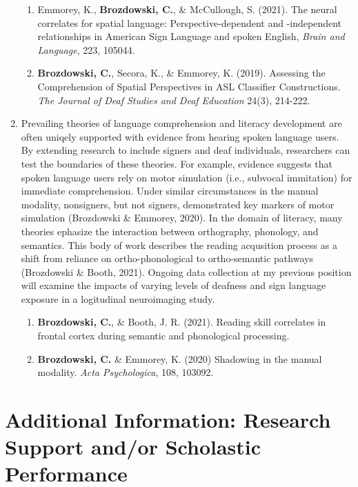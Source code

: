 \documentclass{nihbiosketch}
\begin{document}
\begin{enumerate}
\begin{enumerate}

\item Emmorey, K., \textbf{Brozdowski, C.}, \& McCullough, S. (2021). The neural
        correlates for spatial language: Perspective-dependent and -independent
        relationships in American Sign Language and spoken English,
        \textit{Brain and Language}, 223, 105044.

\item \textbf{Brozdowski, C.}, Secora, K., \& Emmorey, K. (2019). Assessing the
        Comprehension of Spatial Perspectives in ASL Classifier Constructions.
        \textit{The Journal of Deaf Studies and Deaf Education} 24(3), 214-222.

\end{enumerate}
\item Prevailing theories of language comprehension and literacy development are often
 uniqely supported with evidence from hearing spoken language users. By extending
 research to include signers and deaf individuals, researchers can test the boundaries
 of these theories. For example, evidence suggests that spoken language users rely on
 motor simulation (i.e., subvocal immitation) for immediate comprehension. Under
 similar circumstances in the manual modality, nonsigners, but not signers,
 demonstrated key markers of motor simulation (Brozdowski \& Emmorey, 2020). In the
 domain of literacy, many theories ephasize the interaction between orthography,
 phonology, and semantics. This body of work describes the reading acqusition process
 as a shift from reliance on ortho-phonological to ortho-semantic pathways
 (Brozdowski \& Booth, 2021). Ongoing data collection at my previous position will
 examine the impacts of varying levels of deafness and sign language exposure in a
 logitudinal neuroimaging study.

\begin{enumerate}   

\item \textbf{Brozdowski, C.}, \& Booth, J. R. (2021). Reading skill correlates in
        frontal cortex during semantic and phonological processing.

\item \textbf{Brozdowski, C.} \& Emmorey, K. (2020) Shadowing in the manual modality.
        \textit{Acta Psychologica}, 108, 103092.

\end{enumerate}

\end{enumerate}


\section{Additional Information: Research Support and/or Scholastic Performance}
\end{document}
